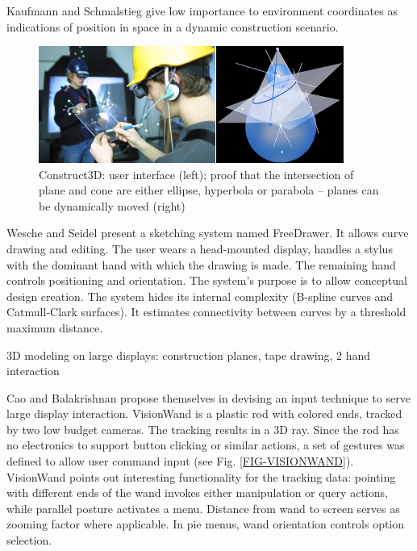 Kaufmann and Schmalstieg give low importance to environment coordinates as indications of
position in space in a dynamic construction scenario.

\begin{figure}[!ht]
	\centering
	\includegraphics[width=10cm]{gfx/vreduc.png}
	\caption{Construct3D: user interface (left); proof that the intersection of plane
and cone are either ellipse, hyperbola or parabola -- planes can be dynamically moved (right)}
	\label{FIG-VREDUC}
\end{figure}

Wesche and Seidel \cite{FREED} present a sketching system named FreeDrawer.
It allows curve drawing and editing. The user wears a head-mounted display, handles a stylus
with the dominant hand with which the drawing is made. The remaining hand controls positioning
and orientation. The system's purpose is to allow conceptual design creation.
The system hides its internal complexity (B-spline curves and Catmull-Clark surfaces).
It estimates connectivity between curves by a threshold maximum distance.



\cite{GROSS}
3D modeling on large displays: construction planes, tape drawing, 2 hand interaction

Cao and Balakrishnan propose themselves in devising an input technique to serve
large display interaction. VisionWand is a plastic rod with colored ends, tracked by
two low budget cameras. The tracking results in a 3D ray. Since the rod has no
electronics to support button clicking or similar actions, a set of gestures was
defined to allow user command input (see Fig. \ref{FIG-VISIONWAND}).
VisionWand points out interesting functionality for the tracking data:
pointing with different ends of the wand invokes either manipulation or query actions,
while parallel posture activates a menu.
Distance from wand to screen serves as zooming factor where applicable.
In pie menus, wand orientation controls option selection.


